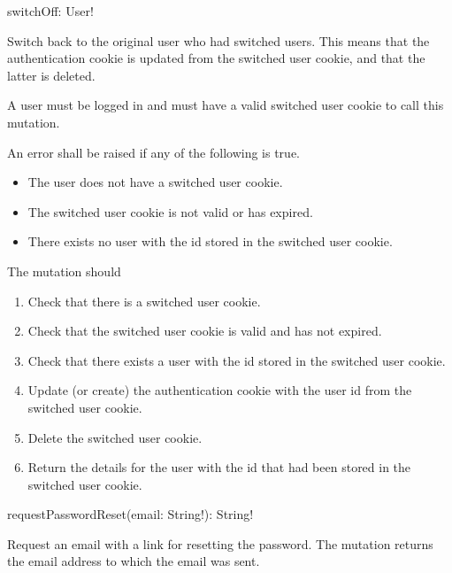 
\begin{code}
switchOff: User!
\end{code}

Switch back to the original user who had switched users. This means that the authentication cookie is updated from the switched user cookie, and that the latter is deleted.

\restrictions

A user must be logged in and must have a valid switched user cookie to call this mutation.

\errors

An error shall be raised if any of the following is true.

\begin{itemize}
    \item The user does not have a switched user cookie.
    \item The switched user cookie is not valid or has expired.
    \item There exists no user with the id stored in the switched user cookie.
\end{itemize}

\functionality

The mutation should

\begin{enumerate}
    \item Check that there is a switched user cookie.
    \item Check that the switched user cookie is valid and has not expired.
    \item Check that there exists a user with the id stored in the switched user cookie.
    \item Update (or create) the authentication cookie with the user id from the switched user cookie.
    \item Delete the switched user cookie.
    \item Return the details for the user with the id that had been stored in the switched user cookie.
\end{enumerate}


\begin{code}
requestPasswordReset(email: String!): String!
\end{code}

Request an email with a link for resetting the password. The mutation returns the email address to which the email was sent.

